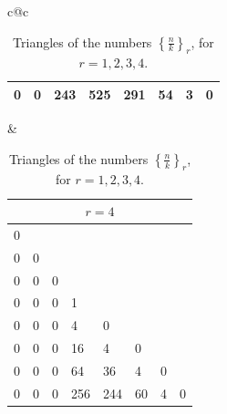 \documentclass[a4paper,11pt,UKenglish]{article}
\newcommand{\sdiff}[3]{\genfrac{\{}{\}}{}{}{{#1}}{{#2}}_{{#3}}}
\theoremstyle{definition}
\begin{document}
\begin{table}[ht]
\begin{tabular}{c@{\hspace{0.5cm}}c}
\begin{tabular}{*{8}{p{1.5em}}}
 0 & 0 & 243 & 525 & 291 & 54 & 3 & 0 \\
\bottomrule
\end{tabular}
&
\begin{tabular}{*{8}{p{1.5em}}}
\multicolumn{8}{c}{$r=4$} \\
\toprule
 0 &   &   &   &   &   &   &   \\
 0 & 0 &   &   &   &   &   &   \\
 0 & 0 & 0 &   &   &   &   &   \\
 0 & 0 & 0 & 1 &   &   &   &   \\
 0 & 0 & 0 & 4 & 0 &   &   &   \\
 0 & 0 & 0 & 16 & 4 & 0 &   &   \\
 0 & 0 & 0 & 64 & 36 & 4 & 0 &   \\
 0 & 0 & 0 & 256 & 244 & 60 & 4 & 0 \\
\bottomrule
\end{tabular}
\end{tabular}
\caption{Triangles of the numbers $\sdiff{n}{k}{r}$,
for $r=1,2,3,4$.}\label{table_sdiff}
\end{table}
\end{document}
